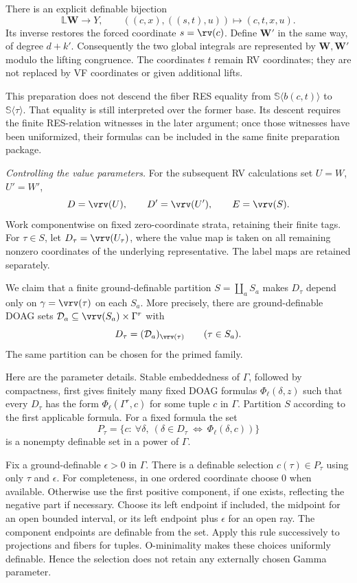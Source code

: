 There is an explicit definable bijection
\[
 \mathbb L\bm W\longrightarrow Y,\qquad
 ((c,x),((s,t),u))\longmapsto(c,t,x,u).
\]
Its inverse restores the forced coordinate $s=\rv(c)$.
Define $\bm W'$ in the same way, of degree $d+k'$.
Consequently the two global integrals are represented by
$\bm W,\bm W'$ modulo the lifting congruence.
The coordinates $t$ remain RV coordinates; they are not
replaced by VF coordinates or given additional lifts.

This preparation does not descend the fiber RES equality
from $\mathbb S\langle b(c,t)\rangle$ to
$\mathbb S\langle\tau\rangle$.
That equality is still interpreted over the former base.
Its descent requires the finite RES-relation witnesses in
the later argument; once those witnesses have been
uniformized, their formulas can be included in the same
finite preparation package.

\medskip
\noindent\emph{Controlling the value parameters.}
For the subsequent RV calculations set $U=W$, $U'=W'$,
\[
 D=\vrv(U),\qquad D'=\vrv(U'),\qquad E=\vrv(S).
\]
Work componentwise on fixed zero-coordinate strata,
retaining their finite tags.
For $\tau\in S$, let $D_\tau=\vrv(U_\tau)$,
where the value map is taken on all remaining nonzero
coordinates of the underlying representative.
The label maps are retained separately.

We claim that a finite ground-definable partition
$S=\coprod_a S_a$ makes $D_\tau$ depend only on
$\gamma=\vrv(\tau)$ on each $S_a$.
More precisely, there are ground-definable DOAG sets
$\mathcal D_a\subseteq\vrv(S_a)\times\Gamma^r$ with
\[
 D_\tau=(\mathcal D_a)_{\vrv(\tau)}
       \qquad(\tau\in S_a).
\]
The same partition can be chosen for the primed family.

Here are the parameter details.
Stable embeddedness of $\Gamma$, followed by compactness,
first gives finitely many fixed DOAG formulas
$\Phi_\ell(\delta,z)$ such that every $D_\tau$ has the form
$\Phi_\ell(\Gamma^r,c)$ for some tuple $c$ in $\Gamma$.
Partition $S$ according to the first applicable formula.
For a fixed formula the set
\[
 P_\tau=\{c:\ \forall\delta,\
       (\delta\in D_\tau\ \Longleftrightarrow\
                    \Phi_\ell(\delta,c))\}
\]
is a nonempty definable set in a power of $\Gamma$.

Fix a ground-definable $\epsilon>0$ in $\Gamma$.
There is a definable selection $c(\tau)\in P_\tau$ using
only $\tau$ and $\epsilon$.
For completeness, in one ordered coordinate choose $0$
when available. Otherwise use the first positive component,
if one exists, reflecting the negative part if necessary.
Choose its left endpoint if included, the midpoint for an
open bounded interval, or its left endpoint plus $\epsilon$
for an open ray. The component endpoints are definable
from the set. Apply this rule successively to projections
and fibers for tuples. O-minimality makes these choices
uniformly definable. Hence the selection does not retain
any externally chosen Gamma parameter.

